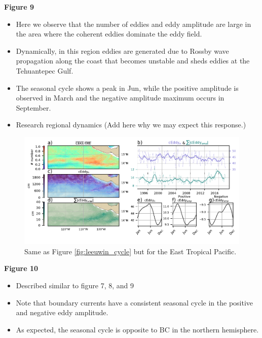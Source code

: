 \documentclass[draft,linenumbers]{agujournal2019}
\begin{document}
	\textbf{Figure 9}
	\begin{itemize}
		\item Here we observe that the number of eddies and eddy amplitude are large in the area where the coherent eddies dominate the eddy field.
		\item Dynamically, in this region eddies are generated due to Rossby wave propagation along the coast that becomes unstable and sheds eddies at the Tehuantepec Gulf.
		\item The seasonal cycle shows a peak in Jun, while the positive amplitude is observed in March and the negative amplitude maximum occurs in September. 
		\item Research regional dynamics (Add here why we may expect this response.)
	\end{itemize}

	\begin{figure}
	    \centering
	    \includegraphics[width=1\textwidth]{figures/regional_ratios_and_stats_V3_3.pdf}
	    \caption{Same as Figure \ref{fig:leeuwin_cycle} but for the East Tropical Pacific.}
	    \label{fig:south_atlantic_cycle}
	\end{figure}

	\textbf{Figure 10}
	\begin{itemize}
		\item Described similar to figure 7, 8, and 9
		\item Note that boundary currents have a consistent seasonal cycle in the positive and negative eddy amplitude.
		\item As expected, the seasonal cycle is opposite to BC in the northern hemisphere.
	\end{itemize}
\end{document}

